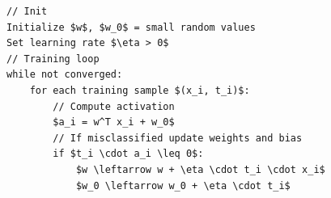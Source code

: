 \begin{lstlisting}[language=pseudo-code,mathescape=true,style={pseudocode-style},caption={Perceptron Learning Algorithm}]
// Init
Initialize $w$, $w_0$ = small random values
Set learning rate $\eta > 0$
// Training loop
while not converged:
    for each training sample $(x_i, t_i)$:
        // Compute activation
        $a_i = w^T x_i + w_0$
        // If misclassified update weights and bias
        if $t_i \cdot a_i \leq 0$:
            $w \leftarrow w + \eta \cdot t_i \cdot x_i$
            $w_0 \leftarrow w_0 + \eta \cdot t_i$
\end{lstlisting}